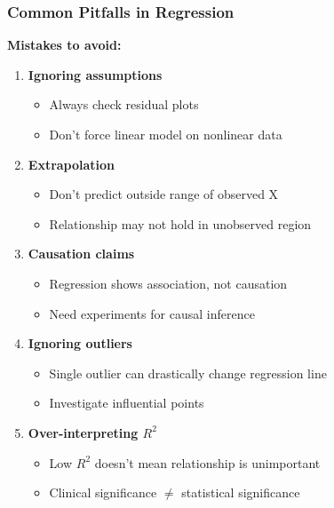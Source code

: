 \documentclass{beamer}
\begin{document}
\begin{frame}
\frametitle{Common Pitfalls in Regression}
\textbf{Mistakes to avoid:}

\begin{enumerate}
\item \textbf{Ignoring assumptions}
  \begin{itemize}
  \item Always check residual plots
  \item Don't force linear model on nonlinear data
  \end{itemize}

\item \textbf{Extrapolation}
  \begin{itemize}
  \item Don't predict outside range of observed X
  \item Relationship may not hold in unobserved region
  \end{itemize}

\item \textbf{Causation claims}
  \begin{itemize}
  \item Regression shows association, not causation
  \item Need experiments for causal inference
  \end{itemize}

\item \textbf{Ignoring outliers}
  \begin{itemize}
  \item Single outlier can drastically change regression line
  \item Investigate influential points
  \end{itemize}

\item \textbf{Over-interpreting $R^2$}
  \begin{itemize}
  \item Low $R^2$ doesn't mean relationship is unimportant
  \item Clinical significance $\neq$ statistical significance
  \end{itemize}
\end{enumerate}
\end{frame}
\end{document}
